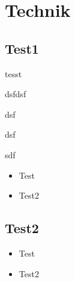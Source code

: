 \section{Technik}


\subsection{Test1}
\begin{frame}


tesst


dsfdsf


dsf


dsf



sdf

\begin{itemize}
\item Test
\item Test2
\end{itemize}
\end{frame}


\subsection{Test2}
\begin{frame}

\begin{itemize}
\item Test
\item Test2
\end{itemize}
\end{frame}